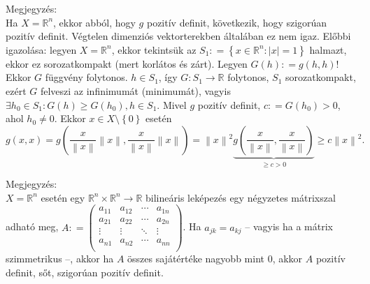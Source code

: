 \documentclass[12pt,a4paper]{scrartcl}
\newenvironment{megjegyzes}{}{}
\begin{document}
\begin{megjegyzes}

Megjegyzés:\\
Ha \(X = {\mathbb{R}}^{n}\), ekkor abból, hogy \(g\) pozitív definit,
következik, hogy szigorúan pozitív definit. Végtelen dimenziós
vektorterekben általában ez nem igaz. Előbbi igazolása: legyen
\(X = {\mathbb{R}}^{n}\), ekkor tekintsük az
\(S_{1}: = \left\{ {x \in {\mathbb{R}}^{n}:\left| x \right| = 1} \right\}\)
halmazt, ekkor ez sorozatkompakt (mert korlátos és zárt). Legyen
\(G\left( h \right): = g\left( {h,h} \right)\)! Ekkor \(G\) függvény
folytonos. \(h \in S_{1}\), így
\(\left. G:S_{1}\rightarrow{\mathbb{R}} \right.\) folytonos, \(S_{1}\)
sorozatkompakt, ezért \(G\) felveszi az infinimumát (minimumát), vagyis
\(\exists h_{0} \in S_{1}:G\left( h \right) \geq G\left( h_{0} \right),h \in S_{1}\).
Mivel \(g\) pozitív definit, \(c: = G\left( h_{0} \right) > 0\), ahol
\(h_{0} \neq 0\). Ekkor
\(x \in X\text{\textbackslash}\left\{ 0 \right\}\) esetén
\[g\left( {x,x} \right) = g\left( {\frac{x}{{\left\| x \right\|}}\left\| x \right\|,\frac{x}{{\left\| x \right\|}}\left\| x \right\|} \right) = {\left\| x \right\|^2}\underbrace {g\left( {\frac{x}{{\left\| x \right\|}},\frac{x}{{\left\| x \right\|}}} \right)}_{ \geqslant c > 0} \geqslant c{\left\| x \right\|^2}.\]

\end{megjegyzes}

\begin{megjegyzes}

Megjegyzés:\\
\(X = {\mathbb{R}}^{n}\) esetén egy
\(\left. {\mathbb{R}}^{n} \times {\mathbb{R}}^{n}\rightarrow{\mathbb{R}} \right.\)
bilineáris leképezés egy négyzetes mátrixszal adható meg,
\(A: = \begin{pmatrix} a_{11} & a_{12} & \cdots & a_{1n} \\ a_{21} & a_{22} & \cdots & a_{2n} \\  \vdots & \vdots & \ddots & \vdots \\ a_{n1} & a_{n2} & \cdots & a_{nn} \\ \end{pmatrix}\).
Ha \(a_{jk} = a_{kj}\) -- vagyis ha a mátrix szimmetrikus --, akkor ha
\(A\) összes sajátértéke nagyobb mint 0, akkor \(A\) pozitív definit,
sőt, szigorúan pozitív definit.

\end{megjegyzes}
\end{document}

